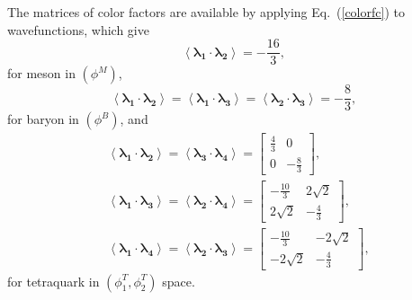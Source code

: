 \documentclass[prt,twocolumn,floatfix,nofootinbib]{revtex4}
\begin{document}
The matrices of color factors are available by applying Eq.~(\ref{colorfc}) to wavefunctions, which give
\begin{equation}\label{cfcM}
    \left\langle \boldsymbol{\lambda_{1}}\cdot \boldsymbol{\lambda_{2}} \right\rangle=-\frac{16}{3},
\end{equation}
for meson in $(\phi^{M})$,
\begin{equation}\label{cfcB}
    \left\langle \boldsymbol{\lambda_{1}}\cdot \boldsymbol{\lambda_{2}} \right\rangle=
    \left\langle \boldsymbol{\lambda_{1}}\cdot \boldsymbol{\lambda_{3}} \right\rangle=
    \left\langle \boldsymbol{\lambda_{2}}\cdot \boldsymbol{\lambda_{3}} \right\rangle=-\frac{8}{3},
\end{equation}
for baryon in $(\phi^{B})$, and
\begin{equation}\label{cfcT}
    \begin{aligned}
        &\left\langle \boldsymbol{\lambda_{1}}\cdot \boldsymbol{\lambda_{2}} \right\rangle=
        \left\langle \boldsymbol{\lambda_{3}}\cdot \boldsymbol{\lambda_{4}} \right\rangle=
        \begin{bmatrix}
            \frac{4}{3} & 0 \\
            0 & -\frac{8}{3}
        \end{bmatrix}, \\
        &\left\langle \boldsymbol{\lambda_{1}}\cdot \boldsymbol{\lambda_{3}} \right\rangle=
        \left\langle \boldsymbol{\lambda_{2}}\cdot \boldsymbol{\lambda_{4}} \right\rangle=
        \begin{bmatrix}
            -\frac{10}{3} & 2\sqrt{2} \\
            2\sqrt{2} & -\frac{4}{3}
        \end{bmatrix}, \\
        &\left\langle \boldsymbol{\lambda_{1}}\cdot \boldsymbol{\lambda_{4}} \right\rangle=
        \left\langle \boldsymbol{\lambda_{2}}\cdot \boldsymbol{\lambda_{3}} \right\rangle=
        \begin{bmatrix}
            -\frac{10}{3} & -2\sqrt{2} \\
            -2\sqrt{2} & -\frac{4}{3}
        \end{bmatrix},
    \end{aligned}
\end{equation}
for tetraquark in $(\phi_{1}^{T},\phi_{2}^{T})$ space.


\medskip
\end{document}
